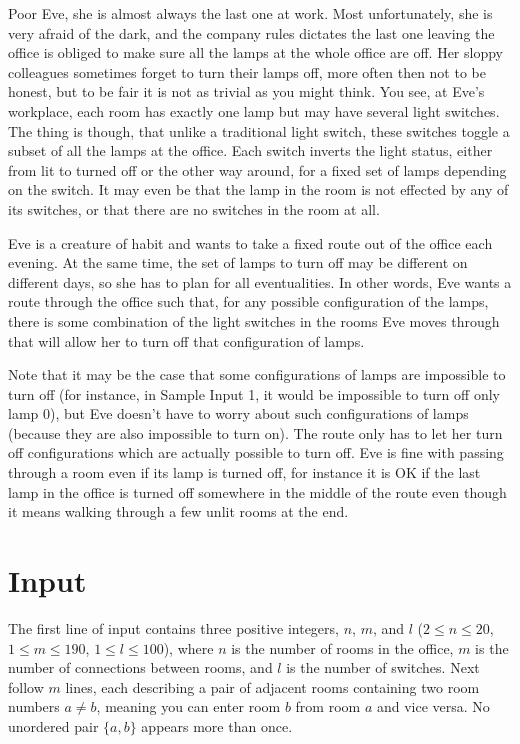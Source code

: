 
%
\noindent
Poor Eve, she is almost always the last one at work. Most
unfortunately, she is very afraid of the dark, and the company rules
dictates the last one leaving the office is obliged to make sure all
the lamps at the whole office are off.  Her sloppy colleagues
sometimes forget to turn their lamps off, more often then not to be
honest, but to be fair it is not as trivial as you might think.  You
see, at Eve's workplace, each room has exactly one lamp but may have
several light switches. The thing is though, that unlike a traditional
light switch, these switches toggle a subset of all the lamps at the
office. Each switch inverts the light status, either from lit to
turned off or the other way around, for a fixed set of lamps depending
on the switch. It may even be that the lamp in the room is not
effected by any of its switches, or that there are no switches in the
room at all.

Eve is a creature of habit and wants to take a fixed route out of the
office each evening.  At the same time, the set of lamps to turn off
may be different on different days, so she has to plan for all
eventualities.  In other words, Eve wants a route through the office
such that, for any possible configuration of the lamps, there is some
combination of the light switches in the rooms Eve moves through that
will allow her to turn off that configuration of lamps.

Note that it may be the case that some configurations of lamps are
impossible to turn off (for instance, in Sample Input 1, it would be
impossible to turn off only lamp $0$), but Eve doesn't have to worry
about such configurations of lamps (because they are also impossible
to turn on).  The route only has to let her turn off configurations
which are actually possible to turn off.  Eve is fine with passing
through a room even if its lamp is turned off, for instance it is OK
if the last lamp in the office is turned off somewhere in the middle
of the route even though it means walking through a few unlit rooms at
the end.

\section*{Input}

The first line of input contains three positive integers, $n$, $m$, and $l$ ($2 \leq n \le 20$, $1 \le m \le 190$, $1 \le l \le 100$), where $n$ is the number of rooms in the office,  $m$ is the number of connections between rooms, and $l$ is the number of switches.
Next follow $m$ lines, each describing a pair of adjacent rooms containing two room numbers $a \ne b$, meaning you can enter room $b$ from room $a$ and vice versa.  No unordered pair $\{a,b\}$ appears more than once.

